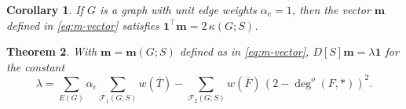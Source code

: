 \documentclass{amsart}
\newtheorem{thm}{Theorem}[section]
\newtheorem{cor}[thm]{Corollary}
\theoremstyle{definition}
\newcommand{\bone}{\mathbf{1}}
\newcommand{\boldm}{\mathbf{m}}
\newcommand{\tr}{\intercal}
\newcommand{\trees}{\mathcal{F}_1}
\newcommand{\forests}{\mathcal{F}}
\newcommand{\degout}{\deg^o}
\begin{document}
\begin{cor}
If $G$ is a graph with unit edge weights $\alpha_e = 1$, then the vector $\boldm$ defined in \eqref{eq:m-vector} satisfies $\bone^\tr \boldm = 2\, \kappa(G;S)$.
\end{cor}

\begin{thm}
\label{thm:m-distance-product}
With $\boldm = \boldm(G;S)$ defined as in \eqref{eq:m-vector},
$D[S] \boldm = \lambda \mathbf{1}$
for the constant
\begin{equation}
\label{eq:lambda}
	\lambda = \sum_{E(G)} \alpha_e \sum_{\trees(G;S)} w(\overline{T}) - \sum_{\forests_2(G;S)} w(\overline{F}) \, (2 - \degout(F,*))^2.
\end{equation}
\end{thm}
\end{document}
